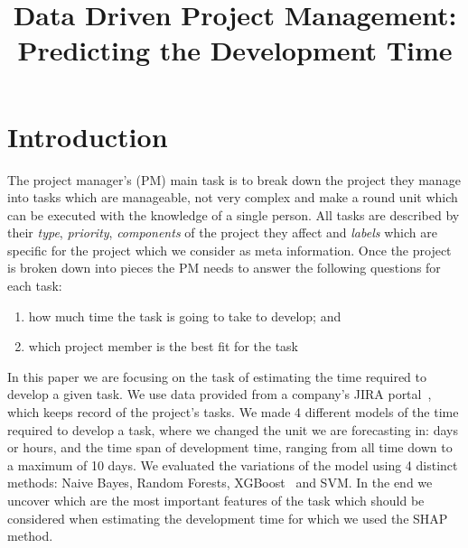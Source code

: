 \documentclass[conference,compsoc]{IEEEtran}
\begin{document}
\title{Data Driven Project Management: \\ Predicting the Development Time}


\author{
}

\maketitle

\begin{abstract}

\end{abstract}

\IEEEpeerreviewmaketitle

\section{Introduction}

The project manager's (PM) main task is to break down the project they manage into tasks which are manageable, not very complex and make a round unit which can be executed with the knowledge of a single person. All tasks are described by their \textit{type}, \textit{priority}, \textit{components} of the project they affect and \textit{labels} which are specific for the project which we consider as meta information. 
Once the project is broken down into pieces the PM needs to answer the following questions for each task:
\begin{enumerate}
	\item how much time the task is going to take to develop; and
	\item which project member is the best fit for the task
\end{enumerate}
In this paper we are focusing on the task of estimating the time required to develop a given task. We use data provided from a company's JIRA portal~\cite{JIRA}, which keeps record of the project's tasks. We made 4 different models of the time required to develop a task, where we changed the unit we are forecasting in: days or hours, and the time span of development time, ranging from all time down to a maximum of 10 days. We evaluated the variations of the model using 4 distinct methods: Naive Bayes, Random Forests, XGBoost~\cite{chen2016xgboost} and SVM. In the end we uncover which are the most important features of the task which should be considered when estimating the development time for which we used the SHAP~\cite{lundberg2020local2global} method.
\end{document}
